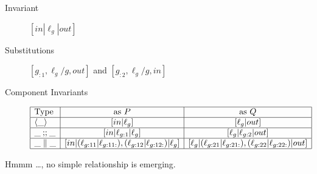 \begin{description}
  \item[Invariant]
    $[in|\ell_g|out]$
  \item[Substitutions]
    $[g_{:1},\ell_g/g,out]$ and $[g_{:2},\ell_g/g,in]$
  \item[Component Invariants]
    $$\begin{array}{|l|c|c|}
    \hline
      \mbox{Type} & \mbox{as }P & \mbox{as }Q
    \\\hline
      \langle\_\rangle & [in|\ell_g] & [\ell_g|out]
    \\\hline
       \_\mathbin{;\!;}\_& [in|\ell_{g:1}|\ell_g] & [\ell_g|\ell_{g:2}|out]
    \\\hline
       \_\parallel\_
       & [in|(\ell_{g:11}|\ell_{g:11:}),(\ell_{g:12}|\ell_{g:12:})|\ell_g]
       & [\ell_g|(\ell_{g:21}|\ell_{g:21:}),(\ell_{g:22}|\ell_{g:22:})|out]
    \\\hline
    \end{array}$$
\end{description}
Hmmm \dots, no simple relationship is emerging.
